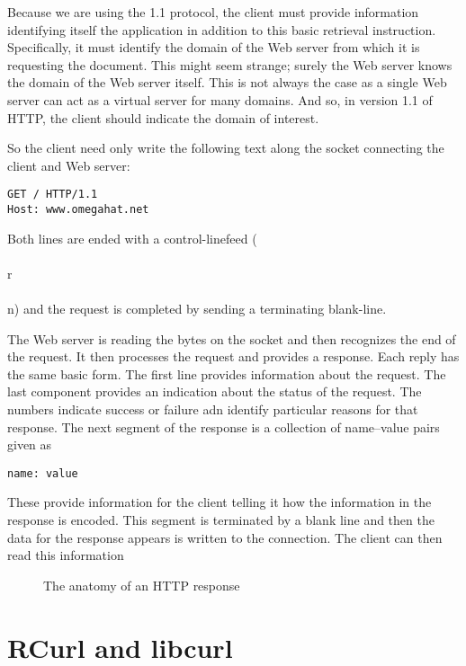 \documentclass{article}
\begin{document}
Because we are using the 1.1 protocol, the client must provide
information identifying itself the application in addition to this
basic retrieval instruction.  Specifically, it must identify the
domain of the Web server from which it is requesting the document.
This might seem strange; surely the Web server knows the domain of the
Web server itself.  This is not always the case as a single Web server
can act as a virtual server for many domains.  And so, in version 1.1
of HTTP, the client should indicate the domain of interest.

So the client need only write the following text 
along the socket connecting the client and Web server:
\begin{verbatim}
GET / HTTP/1.1
Host: www.omegahat.net
\end{verbatim}
Both lines are ended with a control-linefeed (\\\\r\\\\n) and the
request is completed by sending a terminating blank-line.  

The Web server is reading the bytes on the socket and then recognizes
the end of the request.  It then processes the request and provides a
response. Each reply has the same basic form.
The first line provides information about the
request.  The last component provides an indication
about the status of the request.
The numbers indicate  success
or failure adn identify particular
reasons for that response.
The next segment of the response
is a collection of name--value pairs
given as 
\begin{verbatim}
name: value
\end{verbatim}
These provide information for the client
telling it how the information 
in the response is encoded.
This segment is terminated by a blank line
and then the data for the response appears
is written to the connection.
The client can then read  this information
\begin{figure}[htbp]
  \begin{center}
    \leavevmode
    
    \caption{The anatomy of an HTTP response}
    \label{fig:HTTPResponse}
  \end{center}
\end{figure}




\section{RCurl and libcurl}\label{RCurlBasics}
\end{document}
